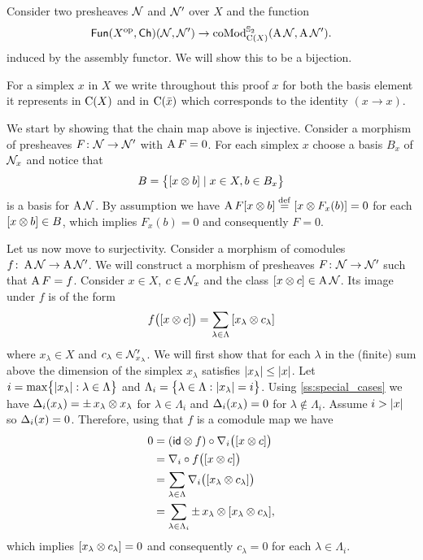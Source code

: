 
Consider two presheaves $\cN$ and $\cN'$ over $X$ and the function
\[
\Fun(X^\op, \Ch)(\cN, \cN') \to \coMod^{\Sym_2}_{\chains(X)}(\assembly \cN, \assembly \cN').
\]
induced by the assembly functor.
We will show this to be a bijection.

For a simplex $x$ in $X$ we write throughout this proof $x$ for both the basis element it represents in $\chains(X)$ and in $\chains(\bar x)$ which corresponds to the identity $(x \to x)$.

We start by showing that the chain map above is injective.
Consider a morphism of presheaves $F \colon \cN \to \cN'$ with $\assembly F = 0$.
For each simplex $x$ choose a basis $B_x$ of $\cN_x$ and notice that
\[
B = \set[\big]{[x \ot b] \mid x \in X, b \in B_x}
\]
is a basis for $\assembly \cN$.
By assumption we have $\assembly F [x \ot b] \defeq [x \ot F_x(b)] = 0$ for each $[x \ot b] \in B$, which implies $F_x(b) = 0$ and consequently $F = 0$.

Let us now move to surjectivity.
Consider a morphism of comodules $f \colon \assembly \cN \to \assembly \cN'$.
We will construct a morphism of presheaves $F \colon \cN \to \cN'$ such that $\assembly F = f$.
Consider $x \in X$, $c \in \cN_x$ and the class $[x \ot c] \in \assembly \cN$.
Its image under $f$ is of the form
\[
f \big( [x \ot c] \big) = \sum_{\lambda \in \Lambda} \, [x_\lambda \ot c_\lambda]
\]
where $x_\lambda \in X$ and $c_\lambda \in \cN'_{x_\lambda}$.
We will first show that for each $\lambda$ in the (finite) sum above the dimension of the simplex $x_\lambda$ satisfies $\bars{x_\lambda} \leq \bars{x}$.
Let $i = \max \set[\big]{\bars{x_\lambda} : \lambda \in \Lambda}$ and $\Lambda_i = \set[\big]{\lambda \in \Lambda : \bars{x_\lambda} = i}$.
Using \cref{ss:special_cases} we have $\copr_i(x_{\lambda}) = \pm \, x_{\lambda} \ot x_{\lambda}$ for $\lambda \in \Lambda_i$ and $\copr_i(x_{\lambda}) = 0$ for $\lambda \notin \Lambda_i$.
Assume $i > \bars{x}$ so $\copr_i(x) = 0$.
Therefore, using that $f$ is a comodule map we have
\begin{align*}
	0 &=
	(\id \ot f) \circ \nabla_i \big( [x \ot c] \big) \\&=
	\nabla_i \circ f \big( [x \ot c] \big) \\&=
	\sum_{\lambda \in \Lambda} \nabla_i \big( [x_\lambda \ot c_\lambda] \big) \\&=
	\sum_{\lambda \in \Lambda_i} \pm \, x_\lambda \ot [x_\lambda \ot c_\lambda],
\end{align*}
which implies $[x_\lambda \ot c_\lambda] = 0$ and consequently $c_{\lambda} = 0$ for each $\lambda \in \Lambda_i$.

